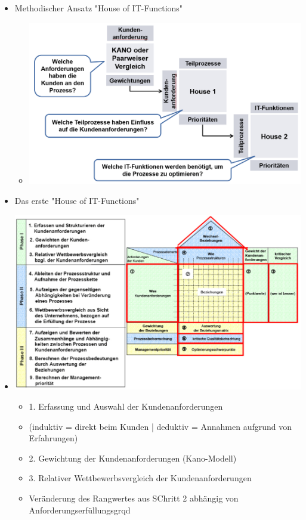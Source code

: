 \documentclass[11pt,a4paper]{article}
\begin{document}
\begin{itemize}
\item Methodischer Ansatz "House of IT-Functions"
	\begin{itemize}
	\item[] \includegraphics[width=15cm]{methodhouseofit}
	\end{itemize}
	\item Das erste "House of IT-Functions"
	\item[] \includegraphics[width=17cm]{houseofit1}
		\begin{itemize}
		\item 1. Erfassung und Auswahl der Kundenanforderungen 
		\item[] (induktiv = direkt beim Kunden | deduktiv = Annahmen aufgrund von Erfahrungen)
		\item 2. Gewichtung der Kundenanforderungen (Kano-Modell)
		\item 3. Relativer Wettbewerbsvergleich der Kundenanforderungen
		\item[] Veränderung des Rangwertes aus SChritt 2 abhängig von Anforderungserfüllungsgrqd

\end{itemize}
\end{itemize}
\end{document}
